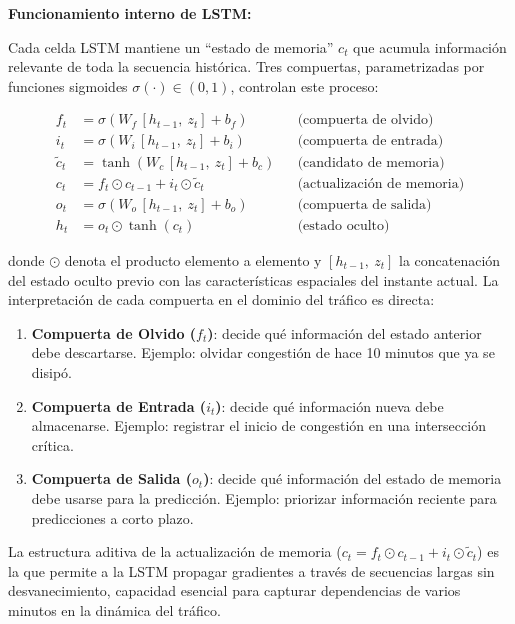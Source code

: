 \documentclass[12pt,a4paper,oneside]{report}
\begin{document}
\textbf{Funcionamiento interno de LSTM:}

Cada celda LSTM mantiene un ``estado de memoria'' \(c_{t}\) que acumula información relevante de toda la secuencia histórica. Tres compuertas, parametrizadas por funciones sigmoides \(\sigma(\cdot) \in (0,1)\), controlan este proceso:

\begin{align}
f_{t} &= \sigma\!\left(W_{f}\,[h_{t - 1},\ z_{t}] + b_{f}\right) && \text{(compuerta de olvido)}\label{eq:lstm-f}\\
i_{t} &= \sigma\!\left(W_{i}\,[h_{t - 1},\ z_{t}] + b_{i}\right) && \text{(compuerta de entrada)}\\
\tilde{c}_{t} &= \tanh\!\left(W_{c}\,[h_{t - 1},\ z_{t}] + b_{c}\right) && \text{(candidato de memoria)}\\
c_{t} &= f_{t} \odot c_{t - 1} + i_{t} \odot \tilde{c}_{t} && \text{(actualización de memoria)}\\
o_{t} &= \sigma\!\left(W_{o}\,[h_{t - 1},\ z_{t}] + b_{o}\right) && \text{(compuerta de salida)}\\
h_{t} &= o_{t} \odot \tanh(c_{t}) && \text{(estado oculto)}\label{eq:lstm-h}
\end{align}

donde \(\odot\) denota el producto elemento a elemento y \([h_{t-1},\ z_{t}]\) la concatenación del estado oculto previo con las características espaciales del instante actual. La interpretación de cada compuerta en el dominio del tráfico es directa:

\begin{enumerate}
\def\labelenumi{\arabic{enumi}.}
\item
  \textbf{Compuerta de Olvido (\(f_{t}\))}: decide qué información del estado anterior debe descartarse. Ejemplo: olvidar congestión de hace 10 minutos que ya se disipó.
\item
  \textbf{Compuerta de Entrada (\(i_{t}\))}: decide qué información nueva debe almacenarse. Ejemplo: registrar el inicio de congestión en una intersección crítica.
\item
  \textbf{Compuerta de Salida (\(o_{t}\))}: decide qué información del estado de memoria debe usarse para la predicción. Ejemplo: priorizar información reciente para predicciones a corto plazo.
\end{enumerate}

La estructura aditiva de la actualización de memoria (\(c_{t} = f_{t} \odot c_{t-1} + i_{t} \odot \tilde{c}_{t}\)) es la que permite a la LSTM propagar gradientes a través de secuencias largas sin desvanecimiento, capacidad esencial para capturar dependencias de varios minutos en la dinámica del tráfico.
\end{document}
